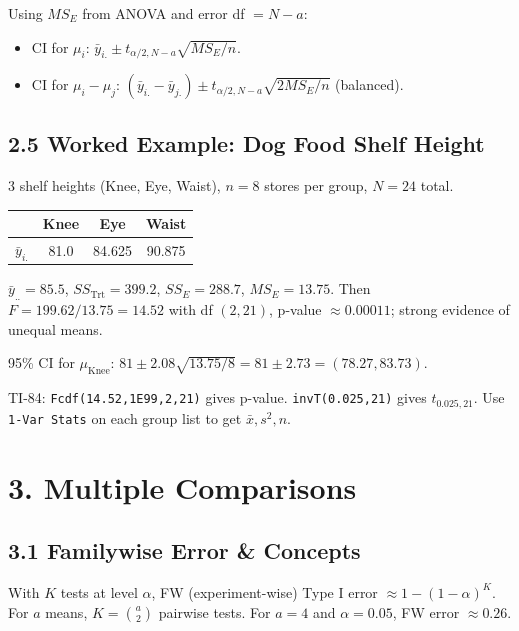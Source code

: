 \documentclass[9pt,letterpaper]{article}
\begin{document}
Using $MS_E$ from ANOVA and error df $=N-a$:
\begin{itemize}
    \item CI for $\mu_i$: $\bar{y}_{i.} \pm t_{\alpha/2,N-a}\sqrt{MS_E/n}$.
    \item CI for $\mu_i-\mu_j$: $(\bar{y}_{i.}-\bar{y}_{j.}) \pm t_{\alpha/2,N-a}\sqrt{2MS_E/n}$ (balanced).
\end{itemize}

\subsection{2.5 Worked Example: Dog Food Shelf Height}

3 shelf heights (Knee, Eye, Waist), $n=8$ stores per group, $N=24$ total.

\begin{center}\small
\begin{tabular}{@{}lccc@{}}
\toprule
 & Knee & Eye & Waist \\
\midrule
$\bar{y}_{i.}$ & 81.0 & 84.625 & 90.875 \\
\bottomrule
\end{tabular}
\end{center}

$\bar{y}_{..}=85.5$, $SS_{\text{Trt}}=399.2$, $SS_E=288.7$, $MS_E=13.75$. Then $F=199.62/13.75=14.52$ with df $(2,21)$, p-value $\approx0.00011$; strong evidence of unequal means.

95\% CI for $\mu_{\text{Knee}}$: $81 \pm 2.08\sqrt{13.75/8}=81\pm2.73=(78.27,83.73)$.

\begin{calcbox}
TI-84: \texttt{Fcdf(14.52,1E99,2,21)} gives p-value. \texttt{invT(0.025,21)} gives $t_{0.025,21}$. Use \texttt{1-Var Stats} on each group list to get $\bar{x},s^2,n$.
\end{calcbox}

\section{3. Multiple Comparisons}

\subsection{3.1 Familywise Error \& Concepts}

With $K$ tests at level $\alpha$, FW (experiment-wise) Type I error $\approx1-(1-\alpha)^K$. For $a$ means, $K=\binom{a}{2}$ pairwise tests. For $a=4$ and $\alpha=0.05$, FW error $\approx0.26$.
\end{document}
